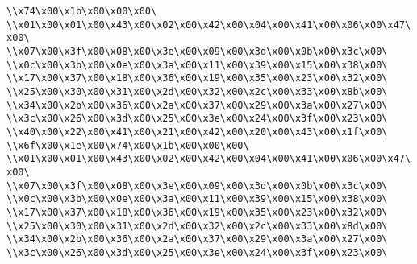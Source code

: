 \verb|\\x74\x00\x1b\x00\x00\x00\|\newline
\verb|\\x01\x00\x01\x00\x43\x00\x02\x00\x42\x00\x04\x00\x41\x00\x06\x00\x47\x00\|\newline
\verb|\\x07\x00\x3f\x00\x08\x00\x3e\x00\x09\x00\x3d\x00\x0b\x00\x3c\x00\|\newline
\verb|\\x0c\x00\x3b\x00\x0e\x00\x3a\x00\x11\x00\x39\x00\x15\x00\x38\x00\|\newline
\verb|\\x17\x00\x37\x00\x18\x00\x36\x00\x19\x00\x35\x00\x23\x00\x32\x00\|\newline
\verb|\\x25\x00\x30\x00\x31\x00\x2d\x00\x32\x00\x2c\x00\x33\x00\x8b\x00\|\newline
\verb|\\x34\x00\x2b\x00\x36\x00\x2a\x00\x37\x00\x29\x00\x3a\x00\x27\x00\|\newline
\verb|\\x3c\x00\x26\x00\x3d\x00\x25\x00\x3e\x00\x24\x00\x3f\x00\x23\x00\|\newline
\verb|\\x40\x00\x22\x00\x41\x00\x21\x00\x42\x00\x20\x00\x43\x00\x1f\x00\|\newline
\verb|\\x6f\x00\x1e\x00\x74\x00\x1b\x00\x00\x00\|\newline
\verb|\\x01\x00\x01\x00\x43\x00\x02\x00\x42\x00\x04\x00\x41\x00\x06\x00\x47\x00\|\newline
\verb|\\x07\x00\x3f\x00\x08\x00\x3e\x00\x09\x00\x3d\x00\x0b\x00\x3c\x00\|\newline
\verb|\\x0c\x00\x3b\x00\x0e\x00\x3a\x00\x11\x00\x39\x00\x15\x00\x38\x00\|\newline
\verb|\\x17\x00\x37\x00\x18\x00\x36\x00\x19\x00\x35\x00\x23\x00\x32\x00\|\newline
\verb|\\x25\x00\x30\x00\x31\x00\x2d\x00\x32\x00\x2c\x00\x33\x00\x8d\x00\|\newline
\verb|\\x34\x00\x2b\x00\x36\x00\x2a\x00\x37\x00\x29\x00\x3a\x00\x27\x00\|\newline
\verb|\\x3c\x00\x26\x00\x3d\x00\x25\x00\x3e\x00\x24\x00\x3f\x00\x23\x00\|\newline
